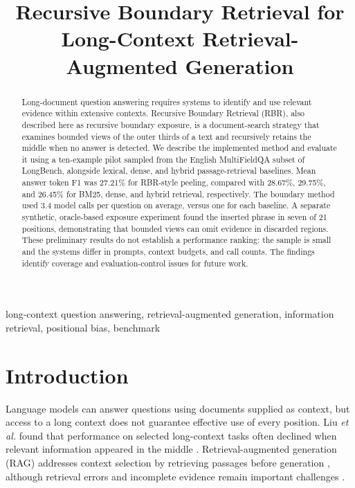 \documentclass[conference]{IEEEtran}
\begin{document}
\title{Recursive Boundary Retrieval for Long-Context Retrieval-Augmented Generation}
\author{}
\maketitle
\begin{abstract}
Long-document question answering requires systems to identify and use relevant evidence within extensive contexts. Recursive Boundary Retrieval (RBR), also described here as recursive boundary exposure, is a document-search strategy that examines bounded views of the outer thirds of a text and recursively retains the middle when no answer is detected. We describe the implemented method and evaluate it using a ten-example pilot sampled from the English MultiFieldQA subset of LongBench, alongside lexical, dense, and hybrid passage-retrieval baselines. Mean answer token F1 was 27.21\% for RBR-style peeling, compared with 28.67\%, 29.75\%, and 26.45\% for BM25, dense, and hybrid retrieval, respectively. The boundary method used 3.4 model calls per question on average, versus one for each baseline. A separate synthetic, oracle-based exposure experiment found the inserted phrase in seven of 21 positions, demonstrating that bounded views can omit evidence in discarded regions. These preliminary results do not establish a performance ranking: the sample is small and the systems differ in prompts, context budgets, and call counts. The findings identify coverage and evaluation-control issues for future work.
\end{abstract}
\begin{IEEEkeywords}
long-context question answering, retrieval-augmented generation, information retrieval, positional bias, benchmark
\end{IEEEkeywords}

\section{Introduction}
Language models can answer questions using documents supplied as context, but access to a long context does not guarantee effective use of every position. Liu \emph{et al.} found that performance on selected long-context tasks often declined when relevant information appeared in the middle \cite{liu}. Retrieval-augmented generation (RAG) addresses context selection by retrieving passages before generation \cite{lewis}, although retrieval errors and incomplete evidence remain important challenges \cite{karpukhin,beir}.
\end{document}
